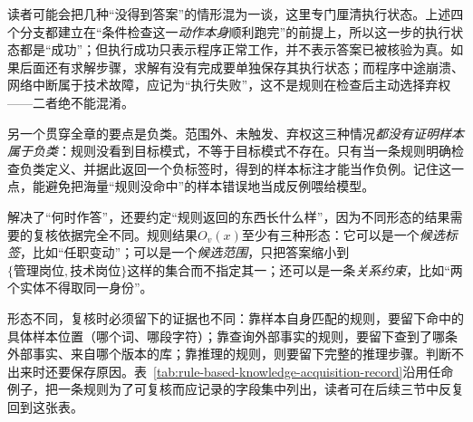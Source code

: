 读者可能会把几种“没得到答案”的情形混为一谈，这里专门厘清执行状态。上述四个分支都建立在“条件检查这一\emph{动作本身}顺利跑完”的前提上，所以这一步的执行状态都是“成功”；但执行成功只表示程序正常工作，并不表示答案已被核验为真。如果后面还有求解步骤，求解有没有完成要单独保存其执行状态；而程序中途崩溃、网络中断属于技术故障，应记为“执行失败”，这不是规则在检查后主动选择弃权——二者绝不能混淆。

另一个贯穿全章的要点是负类。范围外、未触发、弃权这三种情况\emph{都没有证明样本属于负类}：规则没看到目标模式，不等于目标模式不存在。只有当一条规则明确检查负类定义、并据此返回一个负标签时，得到的样本标注才能当作负例。记住这一点，能避免把海量“规则没命中”的样本错误地当成反例喂给模型。

解决了“何时作答”，还要约定“规则返回的东西长什么样”，因为不同形态的结果需要的复核依据完全不同。规则结果$O_v(x)$至少有三种形态：它可以是一个\emph{候选标签}，比如“任职变动”；可以是一个\emph{候选范围}，只把答案缩小到$\{\text{管理岗位},\text{技术岗位}\}$这样的集合而不指定其一；还可以是一条\emph{关系约束}，比如“两个实体不得取同一身份”。

形态不同，复核时必须留下的证据也不同：靠样本自身匹配的规则，要留下命中的具体样本位置（哪个词、哪段字符）；靠查询外部事实的规则，要留下查到了哪条外部事实、来自哪个版本的库；靠推理的规则，则要留下完整的推理步骤。判断不出来时还要保存原因。表~\ref{tab:rule-based-knowledge-acquisition-record}沿用任命例子，把一条规则为了可复核而应记录的字段集中列出，读者可在后续三节中反复回到这张表。

